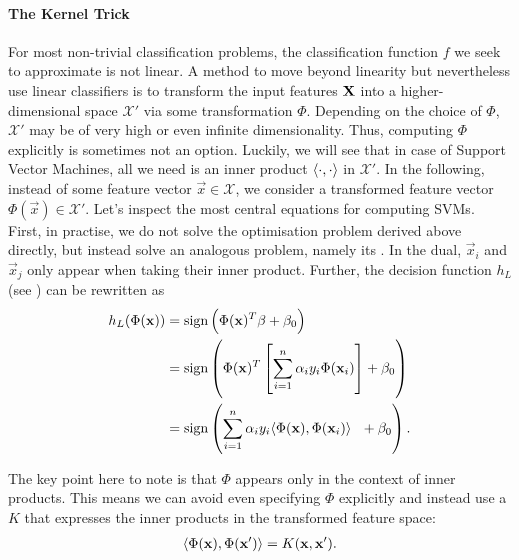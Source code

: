 \documentclass[
	fontsize=10pt, %
	twoside=false, %
	secnumdepth=1, %
  toc=indentunnumbered %
]{kaobook}
\begin{document}
\paragraph{The Kernel Trick} For most non-trivial classification problems, the
classification function $f$ we seek to approximate is not linear. A method to
move beyond linearity but nevertheless use linear classifiers is to
transform the input features $\mathbf{X}$ into a higher-dimensional space
$\mathcal{X}'$ via some transformation $\Phi$. Depending on the choice of
$\Phi$, $\mathcal{X'}$ may be of very high or even infinite dimensionality.
Thus, computing $\Phi$ explicitly is sometimes not an option. Luckily, we will
see that in case of Support Vector Machines, all we need is an inner product
$\langle \cdot, \cdot \rangle$ in $\mathcal{X}'$. In the following, instead of some
feature vector $\vec x \in \mathcal{X}$, we consider a transformed feature
vector $\Phi(\vec x) \in \mathcal{X} '$.
%
Let's inspect the most central equations for computing SVMs. First, in practise,
we do not solve the optimisation problem derived above directly, but instead
solve an analogous problem, namely its . In the dual, $\vec
x_i$ and $\vec x_j$ only appear when taking their inner product.
%
Further, the decision function $h_L$ (see ) can be
rewritten as
\begin{align*}
  h_L(\Phi(\mathbf{x})) & = \text{sign}\left( \Phi(\mathbf{x})^T \mathbf{\beta} + \beta_0  \right)  \\
                    & = \text{sign}\left(  \Phi(\mathbf{x})^T \left[ \sum_{i=1}^n \alpha_i y_i \Phi(\mathbf{x}_i) \right] + \beta_0  \right)\\
  &  = \text{sign}\left( \sum_{i=1}^n \alpha_i y_i \langle \Phi(\mathbf{x}), \Phi(\mathbf{x}_i) \rangle ~~ + \beta_0 \right).
\end{align*}

The key point here to note is that $\Phi$ appears only in the context of inner
products. This means we can avoid even specifying $\Phi$ explicitly and instead
use a  $K$ that expresses the inner products in the
transformed feature space:
\begin{align*}
  \langle \Phi(\mathbf{x}), \Phi(\mathbf{x}') \rangle = K(\mathbf{x}, \mathbf{x}').
\end{align*}
\end{document}
